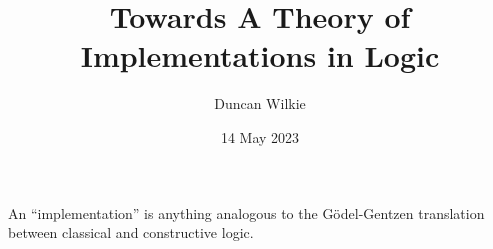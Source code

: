 \documentclass{article}
\title{Towards A Theory of Implementations in Logic}
\author{Duncan Wilkie}
\date{14 May 2023}
\begin{document}
\maketitle

An ``implementation'' is anything analogous to the G\"odel-Gentzen translation between classical and constructive logic.
\end{document}
